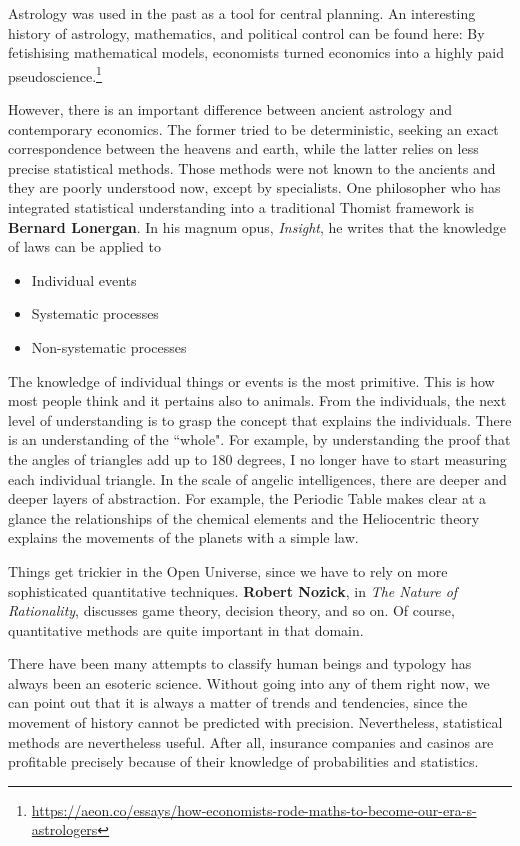 Astrology was used in the past as a tool for central planning. An interesting history of astrology, mathematics, and political control can be found here: By fetishising mathematical models, economists turned economics into a highly paid pseudoscience.\footnote{\url{https://aeon.co/essays/how-economists-rode-maths-to-become-our-era-s-astrologers}}

However, there is an important difference between ancient astrology and contemporary economics. The former tried to be deterministic, seeking an exact correspondence between the heavens and earth, while the latter relies on less precise statistical methods. Those methods were not known to the ancients and they are poorly understood now, except by specialists. One philosopher who has integrated statistical understanding into a traditional Thomist framework is \textbf{Bernard Lonergan}. In his magnum opus, \emph{Insight}, he writes that the knowledge of laws can be applied to

\begin{itemize}
\item Individual events 
\item Systematic processes 
\item Non-systematic processes 
\end{itemize}
The knowledge of individual things or events is the most primitive. This is how most people think and it pertains also to animals. From the individuals, the next level of understanding is to grasp the concept that explains the individuals. There is an understanding of the ``whole". For example, by understanding the proof that the angles of triangles add up to 180 degrees, I no longer have to start measuring each individual triangle. In the scale of angelic intelligences, there are deeper and deeper layers of abstraction. For example, the Periodic Table makes clear at a glance the relationships of the chemical elements and the Heliocentric theory explains the movements of the planets with a simple law.

Things get trickier in the Open Universe, since we have to rely on more sophisticated quantitative techniques. \textbf{Robert Nozick}, in \emph{The Nature of Rationality}, discusses game theory, decision theory, and so on. Of course, quantitative methods are quite important in that domain.

There have been many attempts to classify human beings and typology has always been an esoteric science. Without going into any of them right now, we can point out that it is always a matter of trends and tendencies, since the movement of history cannot be predicted with precision. Nevertheless, statistical methods are nevertheless useful. After all, insurance companies and casinos are profitable precisely because of their knowledge of probabilities and statistics.

